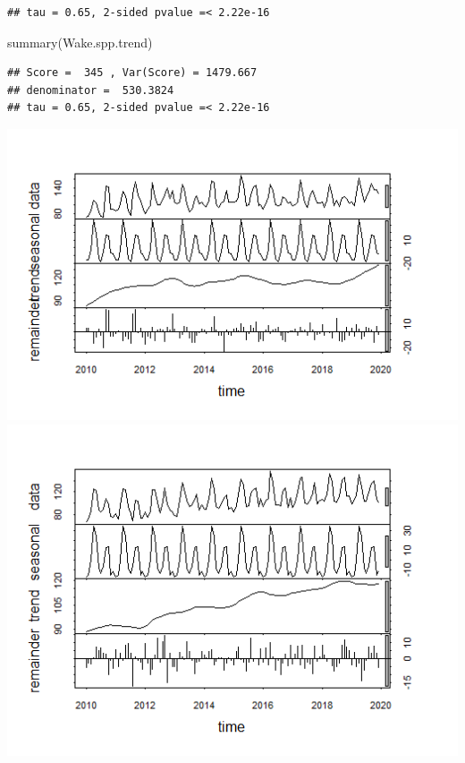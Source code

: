 \documentclass[
  12pt,
]{article}
\newenvironment{Shaded}{\begin{snugshade}}{\end{snugshade}}
\newcommand{\FunctionTok}[1]{\textcolor[rgb]{0.00,0.00,0.00}{#1}}
\newcommand{\NormalTok}[1]{#1}
\begin{document}
\begin{verbatim}
## tau = 0.65, 2-sided pvalue =< 2.22e-16
\end{verbatim}

\begin{Shaded}
\begin{Highlighting}[]
\FunctionTok{summary}\NormalTok{(Wake.spp.trend)}
\end{Highlighting}
\end{Shaded}

\begin{verbatim}
## Score =  345 , Var(Score) = 1479.667
## denominator =  530.3824
## tau = 0.65, 2-sided pvalue =< 2.22e-16
\end{verbatim}

\includegraphics{./Output/Durham_spp_ts_decomp.png}
\includegraphics{./Output/Orange_spp_ts_decomp.png}
\end{document}
